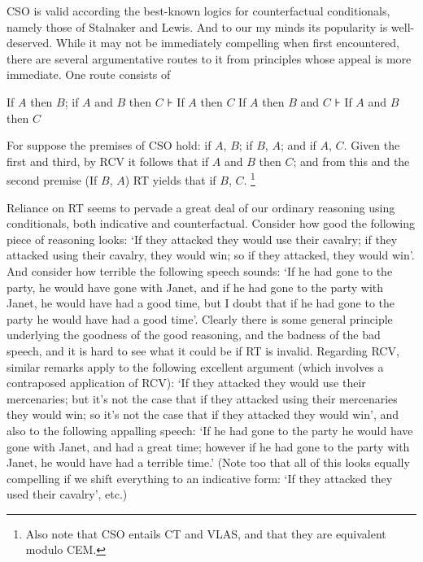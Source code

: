 \documentclass[If.tex]{subfiles}
\begin{document}
\begin{prop}
CSO is valid according the best-known logics for counterfactual conditionals, namely those of Stalnaker and Lewis. And to our my minds its popularity is well-deserved. While it may not be immediately compelling when first encountered, there are several argumentative routes to it from principles whose appeal is more immediate. One route consists of
\begin{prop}  
	If $A$ then $B$; if $A$ and $B$ then $C$ ⊦ If $A$ then $C$ 
	If $A$ then $B$ and $C$ ⊦ If $A$ and $B$ then $C$
\end{prop}
For suppose the premises of CSO hold: if $A$, $B$; if $B$, $A$; and if $A$, $C$. Given the first and third, by RCV it follows that if $A$ and $B$ then $C$; and from this and the second premise (If $B$, $A$) RT yields that if $B$, $C$.%
\footnote{Also note that CSO entails CT and VLAS, and that they are equivalent modulo CEM.}


Reliance on RT seems to pervade a great deal of our ordinary reasoning using conditionals, both indicative and counterfactual. Consider how good the following piece of reasoning looks: ‘If they attacked they would use their cavalry; if they attacked using their cavalry, they would win; so if they attacked, they would win’. And consider how terrible the following speech sounds: ‘If he had gone to the party, he would have gone with Janet, and if he had gone to the party with Janet, he would have had a good time, but I doubt that if he had gone to the party he would have had a good time’. Clearly there is some general principle underlying the goodness of the good reasoning, and the badness of the bad speech, and it is hard to see what it could be if RT is invalid. Regarding RCV, similar remarks apply to the following excellent argument (which involves a contraposed application of RCV): ‘If they attacked they would use their mercenaries; but it's not the case that if they attacked using their mercenaries they would win; so it's not the case that if they attacked they would win’, and also to the following appalling speech: ‘If he had gone to the party he would have gone with Janet, and had a great time; however if he had gone to the party with Janet, he would have had a terrible time.’ (Note too that all of this looks equally compelling if we shift everything to an indicative form: ‘If they attacked they used their cavalry’, etc.)


\end{prop}
\end{document}
